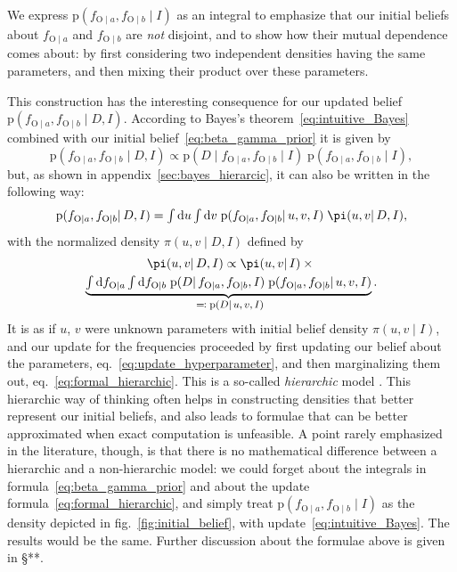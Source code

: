 \documentclass[\ifafour a4paper,12pt,\else a5paper,10pt,\fi%
onecolumn,oneside,article,%
british%
]{memoir}
\theoremstyle{remark}
\theoremstyle{innote}
\newcommand*{\citep}{\parencites}
\newcommand*{\di}{\mathrm{d}}%
\newcommand*{\defs}{\eqqcolon}
\newcommand*{\pf}{\mathrm{p}}%
\renewcommand*{\|}{\mathpunct{|}}
\newcommand*{\sect}{\S}%
\newcommand*{\eqn}{eq.}%
\newcommand*{\fig}{fig.}%
\newcommand*{\zerob}[1]{\makebox[0pt][c]{#1}}
\newcommand*{\tint}{\begingroup\textstyle\int\endgroup\nolimits}
\newcommand*{\yD}{D}
\newcommand*{\yI}{I}
\newcommand*{\ya}{a}
\newcommand*{\yb}{b}
\newcommand*{\ysA}{\textrm{O}}%
\newcommand*{\dbeta}{\betaup}
\newcommand*{\dA}{\pi}
\newcommand*{\yua}{u}
\newcommand*{\yub}{v}
\begin{document}
We express $\pf(f_{\ysA\|\ya}, f_{\ysA\|\yb} \| \yI)$ as an integral to
emphasize that our initial beliefs about $f_{\ysA\|\ya}$ and
$f_{\ysA\|\yb}$ are \emph{not} disjoint, and to show how their mutual
dependence comes about: by first considering two independent densities
having the same parameters, and then mixing their product over these
parameters.

This construction has the interesting consequence for our updated belief
$\pf(f_{\ysA\|\ya}, f_{\ysA\|\yb} \| \yD, \yI)$. According to Bayes's
theorem~\eqref{eq:intuitive_Bayes} combined with our initial
belief~\eqref{eq:beta_gamma_prior} it is given by
\begin{equation}
  \label{eq:straight_Bayes}
  \pf(f_{\ysA\|\ya}, f_{\ysA\|\yb} \| \yD, \yI)
  \propto
  \pf(\yD \| f_{\ysA\|\ya}, f_{\ysA\|\yb} \| \yI)\;
  \pf(f_{\ysA\|\ya}, f_{\ysA\|\yb} \| \yI),
\end{equation}
but, as shown in appendix~\ref{sec:bayes_hierarcic}, it can also be written
in the following way:
\begin{equation}
  \label{eq:formal_hierarchic}
  \pf(f_{\ysA\|\ya}, f_{\ysA\|\yb} \| \yD, \yI) =
  \tint\di\yua\tint\di\yub\;
  \pf(f_{\ysA\|\ya}, f_{\ysA\|\yb}\| \yua,\yub,\yI)\;
  \dA(\yua,\yub \|\yD, \yI),
\end{equation}
with the normalized density $\dA(\yua,\yub \|\yD, \yI)$ defined by
\begin{multline}
  \label{eq:update_hyperparameter}
  \dA(\yua,\yub \|\yD, \yI) \propto   \dA(\yua,\yub \|\yI)
\times{}\\
\underbrace{\tint\di f_{\ysA\|\ya}\tint\di f_{\ysA\|\yb}\;
  \pf(\yD \|f_{\ysA\|\ya}, f_{\ysA\|\yb}, \yI)\;
 \pf(f_{\ysA\|\ya}, f_{\ysA\|\yb} \|\yua,\yub, \yI)}_{\zerob{\footnotesize${}\defs\pf(\yD \|\yua,\yub,\yI)$}}.
\end{multline}
It is as if $\yua$, $\yub$ were unknown parameters with initial belief
density $\dA(\yua,\yub \|\yI)$, and our update for the frequencies proceeded by
first updating our belief about the parameters,
\eqn~\eqref{eq:update_hyperparameter}, and then marginalizing them out,
\eqn~\eqref{eq:formal_hierarchic}. This is a so-called \emph{hierarchic}
model \citep{good1980}. This hierarchic way of thinking often helps in
constructing densities that better represent our initial beliefs, and also
leads to formulae that can be better approximated when exact computation is
unfeasible. A point rarely emphasized in the literature, though, is that
there is no mathematical difference between a hierarchic and a
non-hierarchic model: we could forget about the integrals in
formula~\eqref{eq:beta_gamma_prior} and about the update
formula~\eqref{eq:formal_hierarchic}, and simply treat
$\pf(f_{\ysA\|\ya}, f_{\ysA\|\yb} \| \yI)$ as the density depicted in
\fig~\ref{fig:initial_belief}, with update~\eqref{eq:intuitive_Bayes}. The
results would be the same. Further discussion about the formulae above is
given in \sect***.
\end{document}
